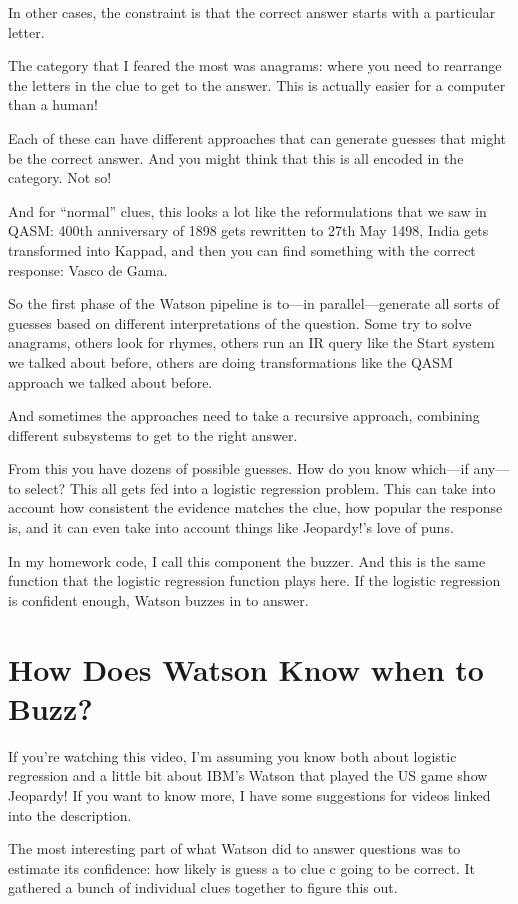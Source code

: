 In other cases, the constraint is that the correct answer starts with a particular letter.  

The category that I feared the most was anagrams: where you need to rearrange the letters in the clue to get to the answer.  This is actually easier for a computer than a human!

Each of these can have different approaches that can generate guesses that might be the correct answer.  And you might think that this is all encoded in the category.  Not so!  

And for “normal” clues, this looks a lot like the reformulations that we saw in QASM: 400th anniversary of 1898 gets rewritten to 27th May 1498, India gets transformed into Kappad, and then you can find something with the correct response: Vasco de Gama.

So the first phase of the Watson pipeline is to—in parallel—generate all sorts of guesses based on different interpretations of the question.  Some try to solve anagrams, others look for rhymes, others run an IR query like the Start system we talked about before, others are doing transformations like the QASM approach we talked about before.  

And sometimes the approaches need to take a recursive approach, combining different subsystems to get to the right answer.

From this you have dozens of possible guesses.  How do you know which—if any—to select?  This all gets fed into a logistic regression problem.  This can take into account how consistent the evidence matches the clue, how popular the response is, and it can even take into account things like Jeopardy!’s love of puns.

In my homework code, I call this component the buzzer.  And this is the same function that the logistic regression function plays here.  If the logistic regression is confident enough, Watson buzzes in to answer.

\section{How Does Watson Know when to Buzz?}

If you’re watching this video, I’m assuming you know both about logistic regression and a little bit about IBM’s Watson that played the US game show Jeopardy!  If you want to know more, I have some suggestions for videos linked into the description.

The most interesting part of what Watson did to answer questions was to estimate its confidence: how likely is guess a to clue c going to be correct.  It gathered a bunch of individual clues together to figure this out.  

